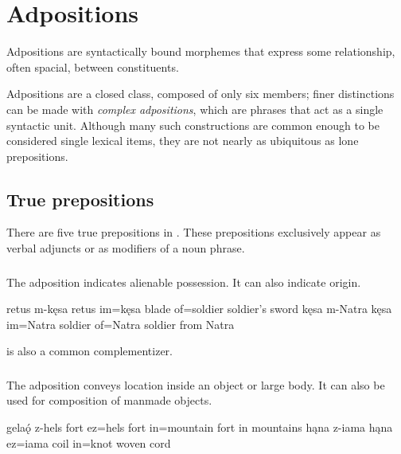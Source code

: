 \setchapterpreamble[u]{\margintoc}
\chapter{Adpositions}
Adpositions are syntactically bound morphemes that express some relationship, often spacial, between constituents. %

Adpositions are a closed class, composed of only six members; finer distinctions can be made with \emph{complex adpositions}, which are phrases that act as a single syntactic unit. %
Although many such constructions are common enough to be considered single lexical items, they are not nearly as ubiquitous as lone prepositions.

\section{True prepositions}
There are five true prepositions in \langname{}. These prepositions exclusively appear as verbal adjuncts or as modifiers of a noun phrase.

\subsection{}
The adposition  indicates alienable possession. It can also indicate origin. 

\begin{subexamples}
    \ex 
        \script retus m-kęsa
        \bits retus im=kęsa
        \gloss blade of=soldier
        \tr soldier's sword
    \ex
        \script kęsa m-Natra
        \bits kęsa im=Natra
        \gloss soldier of=Natra
        \tr soldier from Natra
\end{subexamples}

 is also a common complementizer.

\subsection{}
The adposition  conveys location inside an object or large body. It can also be used for composition of manmade objects.

\begin{subexamples}
    \ex 
        \script gelaǫ́ z-hels
        \bits fort ez=hels
        \gloss fort in=mountain
        \tr fort in mountains
    \ex
        \script hąna z-iama
        \bits hąna ez=iama
        \gloss coil in=knot
        \tr woven cord
\end{subexamples}

